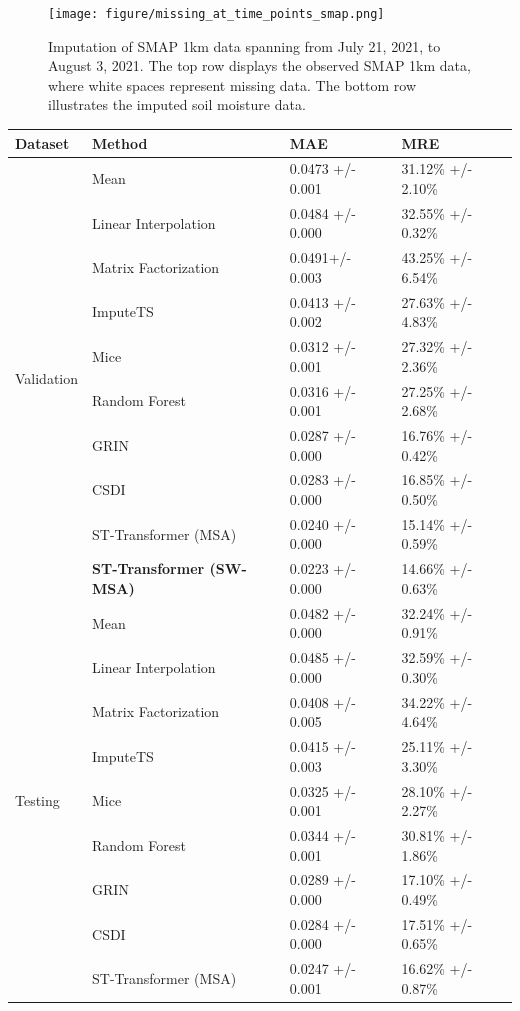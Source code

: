\documentclass[11pt]{article}
\begin{document}
\begin{figure}[H]
\centering
\texttt{[image: figure/missing\_at\_time\_points\_smap.png]}
\caption{Imputation of SMAP 1km data spanning from July 21, 2021, to August 3, 2021. The top row displays the observed SMAP 1km data, where white spaces represent missing data. The bottom row illustrates the imputed soil moisture data.}
\label{fig: missing_at_time_points_smap} 
\end{figure}


\begin{table}[h!]
    \centering
    \begin{tabularx}{\textwidth}{llXX}
        \toprule
        Dataset & Method & MAE & MRE \\
        \midrule
        \multirow{10}{*}{Validation}&
        Mean & 0.0473 +/- 0.001& 31.12\% +/- 2.10\%  \\
        &Linear Interpolation & 0.0484 +/- 0.000 & 32.55\% +/- 0.32\%\\
        &Matrix Factorization & 0.0491+/- 0.003 & 43.25\% +/- 6.54\% \\
        &ImputeTS & 0.0413 +/- 0.002 & 27.63\% +/- 4.83\% \\
        &Mice & 0.0312 +/- 0.001& 27.32\% +/- 2.36\% \\
        &Random Forest &  0.0316 +/- 0.001&  27.25\% +/- 2.68\%\\
        &GRIN & 0.0287 +/- 0.000 & 16.76\% +/- 0.42\%\\
        &CSDI & 0.0283 +/- 0.000 &16.85\% +/- 0.50\%\\
        &ST-Transformer (MSA) & 0.0240 +/- 0.000 & 15.14\% +/- 0.59\%\\
        &\textbf{ST-Transformer (SW-MSA)} & 0.0223 +/- 0.000 & 14.66\% +/- 0.63\%\\
        
        \midrule
        \multirow{10}{*}{Testing}&Mean & 0.0482 +/- 0.000 & 32.24\% +/- 0.91\%  \\
        &Linear Interpolation & 0.0485 +/- 0.000& 32.59\% +/- 0.30\%\\
        &Matrix Factorization & 0.0408 +/- 0.005& 34.22\% +/- 4.64\% \\
        &ImputeTS & 0.0415 +/- 0.003 & 25.11\% +/- 3.30\% \\
        &Mice & 0.0325 +/- 0.001& 28.10\% +/- 2.27\% \\
        &Random Forest &  0.0344 +/- 0.001&  30.81\% +/- 1.86\%\\
        &GRIN & 0.0289 +/- 0.000 & 17.10\% +/- 0.49\%\\
        &CSDI & 0.0284 +/- 0.000 &17.51\% +/- 0.65\%\\
        &ST-Transformer (MSA) & 0.0247 +/- 0.001 & 16.62\% +/- 0.87\%\\


\end{tabularx}
\end{table}
\end{document}
